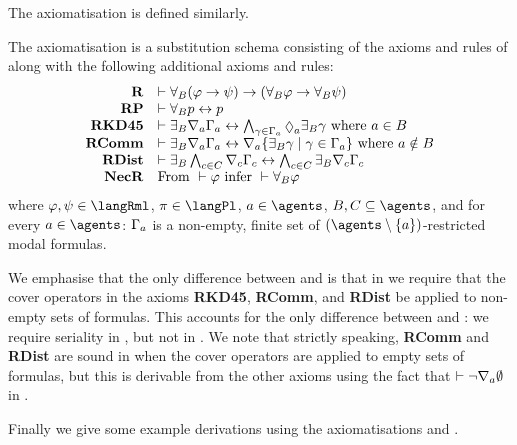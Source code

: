 \pagebreak

The axiomatisation \axiomRmlKD{} is defined similarly.

\begin{definition}
The axiomatisation \axiomRmlKD{} is a substitution schema consisting of the axioms and rules of \axiomKD{} along with the following additional axioms and rules:
$$
\begin{array}{rl}
    {\bf R} & \proves \allrefsBs (\phi \implies \psi) \implies (\allrefsBs \phi \implies \allrefsBs \psi)\\
    {\bf RP} & \proves \allrefsBs \atomP \iff \atomP\\
    {\bf RKD45} & \proves \somerefsBs \coversA \Gamma_\agentA \iff \bigwedge_{\gamma \in \Gamma_\agentA} \possibleA \somerefsBs \gamma \text{ where } \agentA \in \agentsB\\
    {\bf RComm} & \proves \somerefsBs \coversA \Gamma_\agentA \iff \coversA \{\somerefsBs \gamma \mid \gamma \in \Gamma_\agentA\} \text{ where } \agentA \notin \agentsB\\
    {\bf RDist} & \proves \somerefsBs \bigwedge_{\agentC \in \agentsC} \coversC \Gamma_\agentC \iff \bigwedge_{\agentC \in \agentsC} \somerefsBs \coversC \Gamma_\agentC\\
    {\bf NecR} & \text{From } \proves \phi \text{ infer } \proves \allrefsBs \phi
\end{array}
$$
where $\phi, \psi \in \langRml$, $\pi \in \langPl$, $\agentA \in \agents$, $\agentsB, \agentsC \subseteq \agents$, and for every $\agentA \in \agents$: $\Gamma_a$ is a non-empty, finite set of $(\agents \setminus \{\agentA\})$-restricted modal formulas.
\end{definition}

We emphasise that the only difference between \axiomRmlKFF{} and \axiomRmlKD{} is that in \axiomRmlKD{} we require that the cover operators in the axioms {\bf RKD45}, {\bf RComm}, and {\bf RDist} be applied to non-empty sets of formulas.
This accounts for the only difference between \classKFF{} and \classKD{}: we require seriality in \classKD{}, but not in \classKFF{}.
We note that strictly speaking, {\bf RComm} and {\bf RDist} are sound in \logicRmlKD{} when the cover operators are applied to empty sets of formulas, but this is derivable from the other axioms using the fact that $\vdash \lnot \nabla_{a} \emptyset$ in \axiomKD{}.

\pagebreak

Finally we give some example derivations using the axiomatisations \axiomRmlKFF{} and \axiomRmlKD{}.

